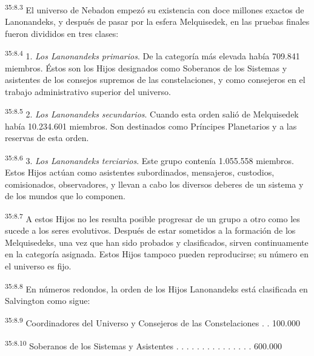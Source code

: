 \par
\textsuperscript{35:8.3} El universo de Nebadon empezó su existencia con doce millones exactos de Lanonandeks, y después de pasar por la esfera Melquisedek, en las pruebas finales fueron divididos en tres clases:

\par
\textsuperscript{35:8.4} 1. \textit{Los Lanonandeks primarios}. De la categoría más elevada había 709.841 miembros. Éstos son los Hijos designados como Soberanos de los Sistemas y asistentes de los consejos supremos de las constelaciones, y como consejeros en el trabajo administrativo superior del universo.

\par
\textsuperscript{35:8.5} 2. \textit{Los Lanonandeks secundarios}. Cuando esta orden salió de Melquisedek había 10.234.601 miembros. Son destinados como Príncipes Planetarios y a las reservas de esta orden.

\par
\textsuperscript{35:8.6} 3. \textit{Los Lanonandeks terciarios}. Este grupo contenía 1.055.558 miembros. Estos Hijos actúan como asistentes subordinados, mensajeros, custodios, comisionados, observadores, y llevan a cabo los diversos deberes de un sistema y de los mundos que lo componen.

\par
\textsuperscript{35:8.7} A estos Hijos no les resulta posible progresar de un grupo a otro como les sucede a los seres evolutivos. Después de estar sometidos a la formación de los Melquisedeks, una vez que han sido probados y clasificados, sirven continuamente en la categoría asignada. Estos Hijos tampoco pueden reproducirse; su número en el universo es fijo.

\par
\textsuperscript{35:8.8} En números redondos, la orden de los Hijos Lanonandeks está clasificada en Salvington como sigue:

\par
\textsuperscript{35:8.9} Coordinadores del Universo y Consejeros de las Constelaciones . .
100.000

\par
\textsuperscript{35:8.10} Soberanos de los Sistemas y Asistentes . . . . . . . . . . . . .
. . 600.000

